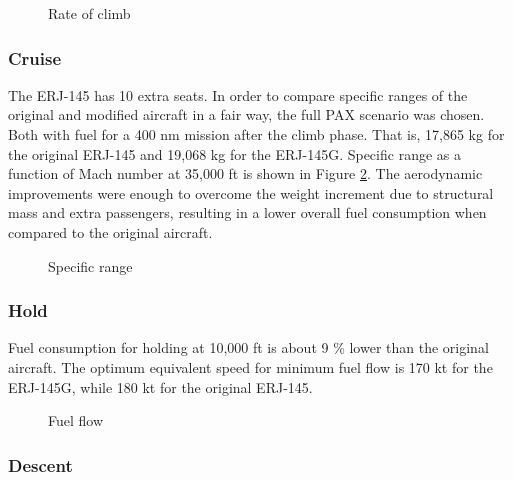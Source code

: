 \begin{figure}[H] %
\caption{Rate of climb}
\label{fig:fig4_rate_of_climb}
\end{figure}

\subsubsection{Cruise}

The ERJ-145 has 10 extra seats. In order to compare specific ranges of the original and modified aircraft in a fair way, the full PAX scenario was chosen. Both with fuel for a 400 nm mission after the climb phase. That is, 17,865 kg for the original ERJ-145 and 19,068 kg for the ERJ-145G. Specific range as a function of Mach number at 35,000 ft is shown in Figure \ref{fig:fig5_specific_range}. The aerodynamic improvements were enough to overcome the weight increment due to structural mass and extra passengers, resulting in a lower overall fuel consumption when compared to the original aircraft.

\begin{figure}[H] %
\caption{Specific range}
\label{fig:fig5_specific_range}
\end{figure}

\subsubsection{Hold}

Fuel consumption for holding at 10,000 ft is about 9 \% lower than the original aircraft. The optimum equivalent speed for minimum fuel flow is 170 kt for the ERJ-145G, while 180 kt for the original ERJ-145.

\begin{figure}[H] %
\caption{Fuel flow}
\label{fig:fig6_fuel_flow_copy}
\end{figure}

\subsubsection{Descent}

